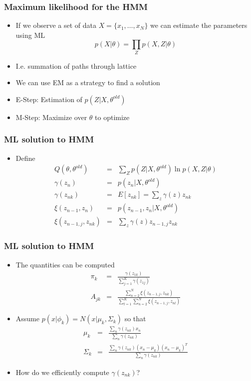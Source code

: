 \documentclass[10pt]{beamer}
\begin{document}
\begin{frame}
  \frametitle{Maximum likelihood for the HMM}
  \begin{itemize}
  \item If we observe a set of data $X=\{ x_1, \ldots, x_N\}$ we can
    estimate the parameters using ML
    \[ p(X|\theta)=\prod_Z p(X, Z| \theta) \]
  \item I.e. summation of paths through lattice
  \item We can use EM as a strategy to find a solution
  \item E-Step: Estimation of $p(Z|X, \theta^{old})$
  \item M-Step: Maximize over $\theta$ to optimize
  \end{itemize}
\end{frame}

\begin{frame}
  \frametitle{ML solution to HMM}
  \begin{itemize}
  \item Define
    \begin{eqnarray*}
      Q(\theta,\theta^{old})&=&\sum_Z p(Z|X, \theta^{old}) \ln p(X,Z|\theta)\\
      \gamma(z_n)&=& p(z_n|X, \theta^{old})\\
      \gamma(z_{nk}) &=& E[z_{nk}] = \sum_z \gamma(z) z_{nk}\\
      \xi(z_{n-1}, z_n) &=& p(z_{n-1}, z_n| X, \theta^{old})\\
      \xi(z_{n-1,j}, z_{nk}) &=& \sum_z \gamma(z) z_{n-1,j} z_{nk}
    \end{eqnarray*}
  \end{itemize}
\end{frame}

\begin{frame}
  \frametitle{ML solution to HMM}
  \begin{itemize}
  \item The quantities can be computed
    \begin{eqnarray*}
      \pi_k &=& \frac{\gamma(z_{1k})}{\sum_{j=1}^K \gamma(z_{1j})}\\
      A_{jk} &=& \frac{\sum_{n=2}^N \xi(z_{n-1,j}, z_{nk})}{
        \sum_{l=1}^K \sum_{n=2}^N \xi(z_{n-1,j}, z_{nl})}
    \end{eqnarray*}
  \item Assume $p(x|\phi_k) = N(x|\mu_k, \Sigma_k)$ so that
    \begin{eqnarray*}
      \mu_k &=& \frac{\sum_n \gamma(z_{nk}) x_n}{\sum_n
        \gamma(z_{nk})}\\
      \Sigma_k &=& \frac{\sum_n \gamma(z_{nk}) (x_n - \mu_k)(x_n - \mu_k)^T}{
        \sum_n \gamma(z_{nk})}
    \end{eqnarray*}
  \item How do we efficiently compute $\gamma(z_{nk})$?
  \end{itemize}
\end{frame}
\end{document}
